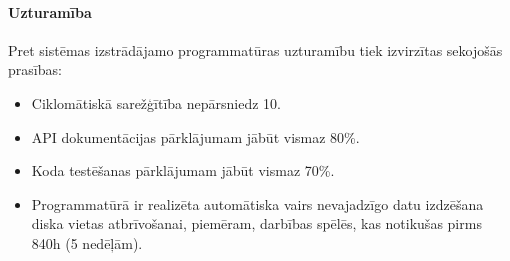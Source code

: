\paragraph{Uzturamība}

Pret sistēmas izstrādājamo programmatūras uzturamību tiek izvirzītas sekojošās prasības:

\begin{itemize}
	\item Ciklomātiskā sarežģītība nepārsniedz 10.
	\item API dokumentācijas pārklājumam jābūt vismaz 80\%.
	\item Koda testēšanas pārklājumam jābūt vismaz 70\%.
	\item Programmatūrā ir realizēta automātiska vairs nevajadzīgo datu izdzēšana diska vietas atbrīvošanai, piemēram, darbības spēlēs, kas notikušas pirms 840h (5 nedēļām).
\end{itemize}
